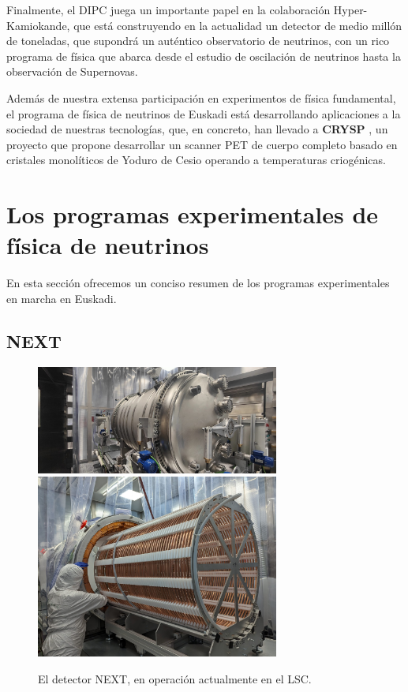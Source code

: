 \documentclass[12pt,a4paper,article]{report} %
\def\crysp{{\bf CRYSP }}
\begin{document}
Finalmente, el DIPC juega un importante papel en la colaboración Hyper-Kamiokande, que está construyendo en la actualidad un detector de medio millón de toneladas, que supondrá un auténtico observatorio de neutrinos, con un rico programa de física que abarca desde el estudio de oscilación de neutrinos hasta la observación de Supernovas.

Además de nuestra extensa participación en experimentos de física fundamental, el programa de física de neutrinos de Euskadi está desarrollando aplicaciones a la sociedad de nuestras tecnologías, que, en concreto, han llevado a \crysp, un proyecto que propone desarrollar un scanner PET de cuerpo completo basado en cristales monolíticos de Yoduro de Cesio operando a temperaturas criogénicas.



\section*{Los programas experimentales de física de neutrinos}

En esta sección ofrecemos un conciso resumen de los programas experimentales en marcha en Euskadi.

\subsection*{NEXT}

\begin{figure}[bht!]
\begin{center}
\includegraphics[width=8cm]{img/next100-vessel.jpeg}
\includegraphics[width=8cm]{img/next-100-fc.jpg}
\caption{El detector NEXT, en operación actualmente en el LSC.}
\label{fig:xess}
\end{center}
\end{figure}
\end{document}
